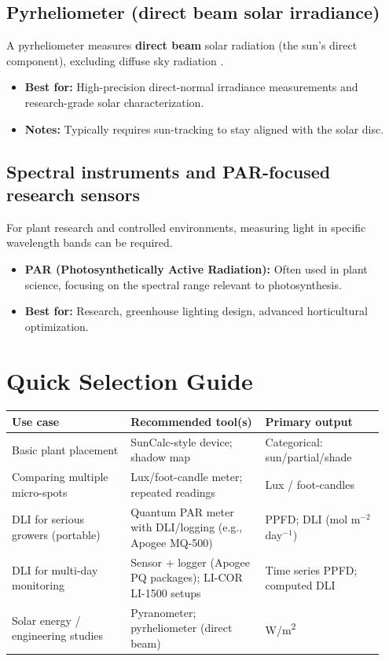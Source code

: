 \documentclass[11pt]{article}
\begin{document}
\subsection{Pyrheliometer (direct beam solar irradiance)}
A pyrheliometer measures \textbf{direct beam} solar radiation (the sun's direct component), excluding diffuse sky radiation \cite{hukseflux_instrument_select}.
\begin{itemize}
  \item \textbf{Best for:} High-precision direct-normal irradiance measurements and research-grade solar characterization.
  \item \textbf{Notes:} Typically requires sun-tracking to stay aligned with the solar disc.
\end{itemize}

\subsection{Spectral instruments and PAR-focused research sensors}
For plant research and controlled environments, measuring light in specific wavelength bands can be required.
\begin{itemize}
  \item \textbf{PAR (Photosynthetically Active Radiation):} Often used in plant science, focusing on the spectral range relevant to photosynthesis.
  \item \textbf{Best for:} Research, greenhouse lighting design, advanced horticultural optimization.
\end{itemize}

\section{Quick Selection Guide}
\begin{table}[h!]
\centering
\begin{tabular}{@{}p{0.30\linewidth}p{0.34\linewidth}p{0.30\linewidth}@{}}
\toprule
\textbf{Use case} & \textbf{Recommended tool(s)} & \textbf{Primary output} \\
\midrule
Basic plant placement & SunCalc-style device; shadow map & Categorical: sun/partial/shade \\
Comparing multiple micro-spots & Lux/foot-candle meter; repeated readings & Lux / foot-candles \\
DLI for serious growers (portable) & Quantum PAR meter with DLI/logging (e.g., Apogee MQ-500) & PPFD; DLI (mol m$^{-2}$ day$^{-1}$) \\
DLI for multi-day monitoring & Sensor + logger (Apogee PQ packages); LI-COR LI-1500 setups & Time series PPFD; computed DLI \\
Solar energy / engineering studies & Pyranometer; pyrheliometer (direct beam) & W/m\textsuperscript{2} \\
\bottomrule
\end{tabular}
\end{table}
\end{document}
